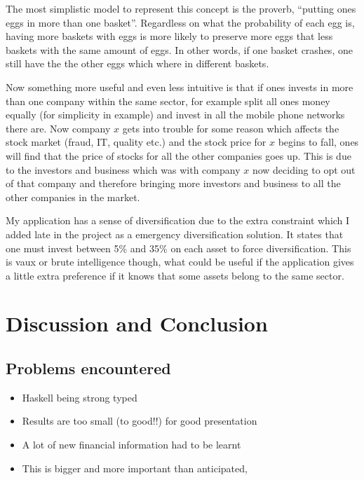 \documentclass{pdfmx4020}
\begin{document}
    The most simplistic model to represent this concept is the proverb, ``putting ones eggs in more than one basket''. Regardless on what the probability of each egg is, having more baskets with eggs is more likely to preserve more eggs that less baskets with the same amount of eggs. In other words, if one basket crashes, one still have the the other eggs which where in different baskets. 

    Now something more useful and even less intuitive is that if ones invests in more than one company within the same sector, for example split all ones money equally (for simplicity in example) and invest in all the mobile phone networks there are. Now company $x$ gets into trouble for some reason which affects the stock market (fraud, IT, quality etc.) and the stock price for $x$ begins to fall, ones will find that the price of stocks for all the other companies goes up. This is due to the investors and business which was with company $x$ now deciding to opt out of that company and therefore bringing more investors and business to all the other companies in the market. 

    My application has a sense of diversification due to the extra constraint which I added late in the project as a emergency diversification solution. It states that one must invest between 5\% and 35\% on each asset to force diversification. This is vaux or brute intelligence though, what could be useful if the application gives a little extra preference if it knows that some assets belong to the same sector. 


\chapter{Discussion and Conclusion}
  
  \section{Problems encountered} %
  \label{sec:problems_encountered}
    \begin{itemize}
      \item Haskell being strong typed
      \item Results are too small (to good!!) for good presentation
      \item A lot of new financial information had to be learnt
      \item This is bigger and more important than anticipated, 
    \end{itemize}
  
\end{document}
